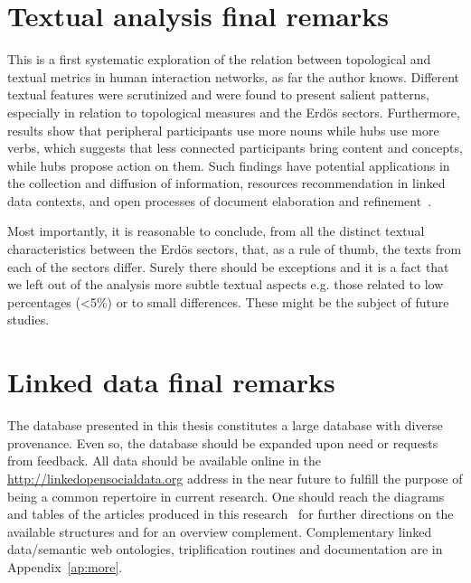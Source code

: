 \section{Textual analysis final remarks}\label{sec:remarks}
This is a first systematic exploration of the relation between topological and textual
metrics in human interaction networks, as far the author knows.
Different textual features were scrutinized and were found to present
salient patterns, especially in relation to topological measures and the Erd\"os sectors.
Furthermore, results show that peripheral participants use more nouns while hubs use more verbs,
which suggests that less connected participants bring content and concepts,
while hubs propose action on them.
Such findings have potential applications in the collection and diffusion of information,
resources recommendation in linked data contexts,
and open processes of document elaboration and refinement~\cite{ensaio,ops,opa,stab,pnud4,pnud3}.

Most importantly, it is reasonable to conclude, from all the distinct textual characteristics
between the Erd\"os sectors, that, as a rule of thumb, the texts from each of the sectors differ.
Surely there should be exceptions and it is a fact that we left out of the analysis
more subtle textual aspects e.g. those related to low percentages (<5\%) or to small
differences.
These might be the subject of future studies.

\section{Linked data final remarks}
The database presented in this thesis
constitutes a large database with diverse provenance.
Even so, the database should be expanded upon need or requests from feedback.
All data should be available online in the \url{http://linkedopensocialdata.org}
address in the near future to fulfill the purpose of being a common
repertoire in current research.
One should reach the diagrams and tables of the 
articles produced in this research~\cite{stab,rcText,versinus,losd}
for further directions
on the available structures and for an overview complement.
Complementary linked data/semantic web ontologies, triplification routines
and documentation are in Appendix~\ref{ap:more}.

